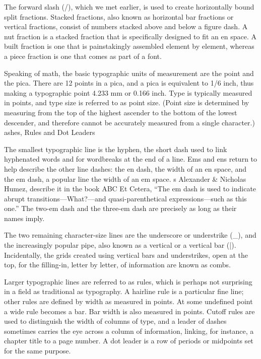 \documentclass[12pt,a4paper,twocolumn]{book} %
\begin{document}
The forward slash (/), which we met earlier, is used to create horizontally bound split fractions. Stacked fractions, also known as horizontal bar fractions or vertical fractions, consist of numbers stacked above and below a figure dash. A nut fraction is a stacked fraction that is specifically designed to fit an en space. A built fraction is one that is painstakingly assembled element by element, whereas a piece fraction is one that comes as part of a font.

Speaking of math, the basic typographic units of measurement are the point and the pica. There are 12 points in a pica, and a pica is equivalent to 1/6 inch, thus making a typographic point 4.233 mm or 0.166 inch. Type is typically measured in points, and type size is referred to as point size. (Point size is determined by measuring from the top of the highest ascender to the bottom of the lowest descender, and therefore cannot be accurately measured from a single character.)
ashes, Rules and Dot Leaders

The smallest typographic line is the hyphen, the short dash used to link hyphenated words and for wordbreaks at the end of a line. Ems and ens return to help describe the other line dashes: the en dash, the width of an en space, and the em dash, a popular line the width of an em space.
s Alexander \& Nicholas Humez, describe it in the book ABC Et Cetera, “The em dash is used to indicate abrupt transitions—What?—and quasi-parenthetical expressions—such as this one.” The two-em dash and the three-em dash are precisely as long as their names imply.

The two remaining character-size lines are the underscore or understrike (\_), and the increasingly popular pipe, also known as a vertical or a vertical bar (|). Incidentally, the grids created using vertical bars and understrikes, open at the top, for the filling-in, letter by letter, of information are known as combs.

Larger typographic lines are referred to as rules, which is perhaps not surprising in a field as traditional as typography. A hairline rule is a particular fine line; other rules are defined by width as measured in points. At some undefined point a wide rule becomes a bar. Bar width is also measured in points. Cutoff rules are used to distinguish the width of columns of type, and a leader of dashes sometimes carries the eye across a column of information, linking, for instance, a chapter title to a page number. A dot leader is a row of periods or midpoints set for the same purpose.
\end{document}
